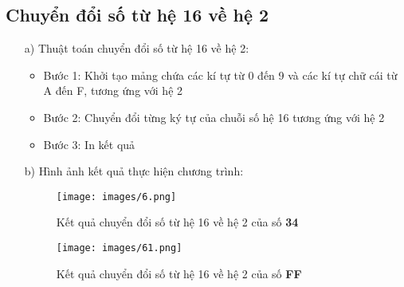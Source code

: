 \documentclass[20pt]{article}
\begin{document}
\subsection{Chuyển đổi số từ hệ 16 về hệ 2}
\begin{enumerate}
    \item[a)] Thuật toán chuyển đổi số từ hệ 16 về hệ 2:
    \begin{itemize}
        \item Bước 1: Khởi tạo mảng chứa các kí tự từ 0 đến 9 và các kí tự chữ cái từ A đến F, tương ứng với hệ 2
        \item Bước 2: Chuyển đổi từng ký tự của chuỗi số hệ 16 tương ứng với hệ 2
        \item Bước 3: In kết quả
    \end{itemize}
    \item[b)] Hình ảnh kết quả thực hiện chương trình:
    \begin{figure}[H]
        \centering
        \texttt{[image: images/6.png]}
        \caption{Kết quả chuyển đổi số từ hệ 16 về hệ 2 của số \textbf{34}}
        \label{fig:my_label}
    \end{figure}
    \begin{figure}[H]
        \centering
        \texttt{[image: images/61.png]}
        \caption{Kết quả chuyển đổi số từ hệ 16 về hệ 2 của số \textbf{FF}}
        \label{fig:my_label}
    \end{figure}
\end{enumerate}
\end{document}
